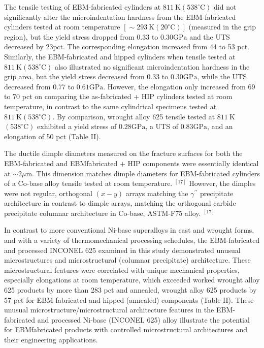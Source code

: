 \documentclass[10pt]{article}
\begin{document}
The tensile testing of EBM-fabricated cylinders at $811 \mathrm{~K}\left(538^{\circ} \mathrm{C}\right)$ did not significantly alter the microindentation hardness from the EBM-fabricated cylinders tested at room temperature $\left[\sim 293 \mathrm{~K}\left(20^{\circ} \mathrm{C}\right)\right]$ (measured in the grip region), but the yield stress dropped from 0.33 to $0.30 \mathrm{GPa}$ and the UTS decreased by $23 \mathrm{pct}$. The corresponding elongation increased from 44 to 53 pct. Similarly, the EBM-fabricated and hipped cylinders when tensile tested at $811 \mathrm{~K}\left(538^{\circ} \mathrm{C}\right)$ also illustrated no significant microindentation hardness in the grip area, but the yield stress decreased from 0.33 to $0.30 \mathrm{GPa}$, while the UTS decreased from 0.77 to $0.61 \mathrm{GPa}$. However, the elongation only increased from 69 to 70 pct on comparing the as-fabricated + HIP cylinders tested at room temperature, in contrast to the same cylindrical specimens tested at $811 \mathrm{~K}\left(538{ }^{\circ} \mathrm{C}\right)$. By comparison, wrought alloy 625 tensile tested at $811 \mathrm{~K}$ $\left(538^{\circ} \mathrm{C}\right)$ exhibited a yield stress of $0.28 \mathrm{GPa}$, a UTS of $0.83 \mathrm{GPa}$, and an elongation of 50 pct (Table II).

The ductile dimple diameters measured on the fracture surfaces for both the EBM-fabricated and EBMfabricated + HIP components were essentially identical\\
at $\sim 2 \mu \mathrm{m}$. This dimension matches dimple diameters for EBM-fabricated cylinders of a Co-base alloy tensile tested at room temperature. ${ }^{[17]}$ However, the dimples were not regular, orthogonal $(x-y)$ arrays matching the $\gamma^{\prime \prime}$ precipitate architecture in contrast to dimple arrays, matching the orthogonal carbide precipitate columnar architecture in Co-base, ASTM-F75 alloy. ${ }^{[17]}$

In contrast to more conventional Ni-base superalloys in cast and wrought forms, and with a variety of thermomechanical processing schedules, the EBM-fabricated and processed INCONEL 625 examined in this study demonstrated unusual microstructures and microstructural (columnar precipitate) architecture. These microstructural features were correlated with unique mechanical properties, especially elongations at room temperature, which exceeded worked wrought alloy 625 products by more than 283 pct and annealed, wrought alloy 625 products by 57 pct for EBM-fabricated and hipped (annealed) components (Table II). These unusual microstructure/microstructural architecture features in the EBM-fabricated and processed Ni-base (INCONEL 625) alloy illustrate the potential for EBMfabricated products with controlled microstructural architectures and their engineering applications.
\end{document}
